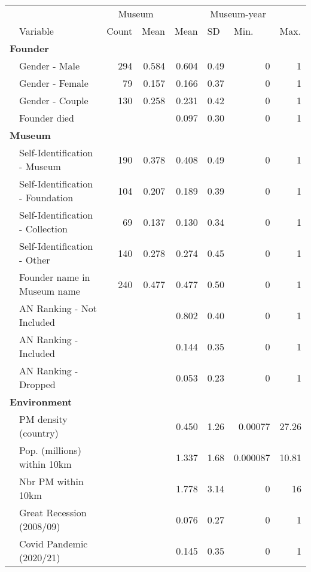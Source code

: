 \documentclass[12pt]{article}
\begin{document}
\begin{table}[ht]
\centering
\begin{tabular}{llrrrrrr}
  \hline
 & & \multicolumn{2}{c}{Museum} & \multicolumn{4}{c}{Museum-year} \\ 
\cmidrule(r){3-4}\cmidrule(r){5-8} \multicolumn{1}{l}{} & \multicolumn{1}{l}{Variable} & \multicolumn{1}{l}{Count} & \multicolumn{1}{l}{Mean} & \multicolumn{1}{l}{Mean} & \multicolumn{1}{l}{SD} & \multicolumn{1}{l}{Min.} & \multicolumn{1}{l}{Max.}\\ 
 \hline
  \multicolumn{8}{l}{\textbf{Founder}} \\ 
 & Gender - Male & 294 & 0.584 & 0.604 & 0.49 & 0 & 1 \\ 
   & Gender - Female & 79 & 0.157 & 0.166 & 0.37 & 0 & 1 \\ 
   & Gender - Couple & 130 & 0.258 & 0.231 & 0.42 & 0 & 1 \\ 
   & Founder died &  &  & 0.097 & 0.30 & 0 & 1 \\ 
   \multicolumn{8}{l}{\textbf{Museum}} \\ 
 & Self-Identification - Museum & 190 & 0.378 & 0.408 & 0.49 & 0 & 1 \\ 
   & Self-Identification - Foundation & 104 & 0.207 & 0.189 & 0.39 & 0 & 1 \\ 
   & Self-Identification - Collection & 69 & 0.137 & 0.130 & 0.34 & 0 & 1 \\ 
   & Self-Identification - Other & 140 & 0.278 & 0.274 & 0.45 & 0 & 1 \\ 
   & Founder name in Museum name & 240 & 0.477 & 0.477 & 0.50 & 0 & 1 \\ 
   & AN Ranking - Not Included &  &  & 0.802 & 0.40 & 0 & 1 \\ 
   & AN Ranking - Included &  &  & 0.144 & 0.35 & 0 & 1 \\ 
   & AN Ranking - Dropped &  &  & 0.053 & 0.23 & 0 & 1 \\ 
   \multicolumn{8}{l}{\textbf{Environment}} \\ 
 & PM density (country) &  &  & 0.450 & 1.26 & 0.00077 & 27.26 \\ 
   & Pop. (millions) within 10km &  &  & 1.337 & 1.68 & 0.000087 & 10.81 \\ 
   & Nbr PM within 10km &  &  & 1.778 & 3.14 & 0 & 16 \\ 
   & Great Recession (2008/09) &  &  & 0.076 & 0.27 & 0 & 1 \\ 
   & Covid Pandemic (2020/21) &  &  & 0.145 & 0.35 & 0 & 1 \\ 

\end{tabular}
\end{table}
\end{document}
